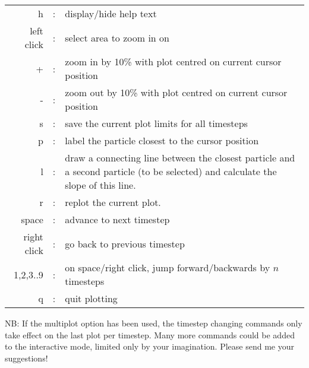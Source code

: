 \documentclass[a4paper,12pt]{article}
\begin{document}
\begin{tabular}{rcp{}}
 h & : & display/hide help text \\
 left click & : & select area to zoom in on \\
 + & : & zoom in by 10\% with plot centred on current cursor position \\
 - & : & zoom out by 10\% with plot centred on current cursor position \\ 
 s & : & save the current plot limits for all timesteps \\
 p & : & label the particle closest to the cursor position \\
 l & : & draw a connecting line between the closest particle and a second
 particle (to be selected) and calculate the slope of this line. \\
 r & : & replot the current plot. \\
 space & : & advance to next timestep \\
 right click & : & go back to previous timestep \\
  1,2,3..9 & : & on space/right click, jump forward/backwards by $n$ timesteps \\
  q & : & quit plotting 
\end{tabular}

 NB: If the multiplot option has been used, the timestep changing commands only
take effect on the last plot per timestep. Many more commands could be added to
the interactive mode, limited only by your imagination. Please send me your suggestions!
\end{document}
